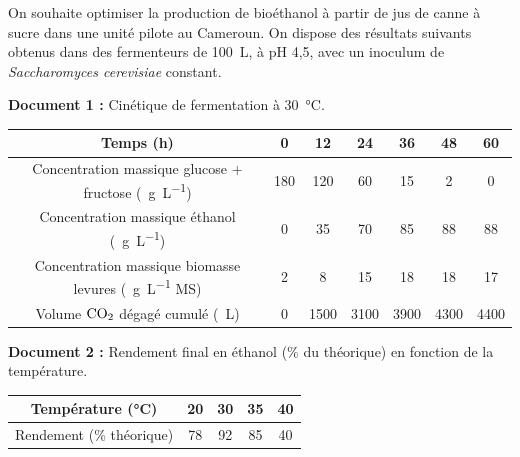 \documentclass[11pt]{article}
\begin{document}
\begin{exercice}
On souhaite optimiser la production de bioéthanol à partir de jus de canne à sucre dans une unité pilote au Cameroun. On dispose des résultats suivants obtenus dans des fermenteurs de \SI{100}{\liter}, à pH 4,5, avec un inoculum de \emph{Saccharomyces cerevisiae} constant.

\textbf{Document 1 :} Cinétique de fermentation à \SI{30}{\celsius}.
\begin{center}
\begin{tabular}{|c|c|c|c|c|c|c|}\hline
Temps (h) & 0 & 12 & 24 & 36 & 48 & 60 \\ \hline
Concentration massique glucose + fructose (\SI{}{\gram\per\liter}) & 180 & 120 & 60 & 15 & 2 & 0 \\ \hline
Concentration massique éthanol (\SI{}{\gram\per\liter}) & 0 & 35 & 70 & 85 & 88 & 88 \\ \hline
Concentration massique biomasse levures (\SI{}{\gram\per\liter} MS) & 2 & 8 & 15 & 18 & 18 & 17 \\ \hline
Volume $\ce{CO2}$ dégagé cumulé (\SI{}{\liter}) & 0 & 1500 & 3100 & 3900 & 4300 & 4400 \\ \hline
\end{tabular}
\end{center}

\textbf{Document 2 :} Rendement final en éthanol (\% du théorique) en fonction de la température.
\begin{center}
\begin{tabular}{|c|c|c|c|c|}\hline
Température (°C) & 20 & 30 & 35 & 40 \\ \hline
Rendement (\% théorique) & 78 & 92 & 85 & 40 \\ \hline
\end{tabular}
\end{center}


\end{exercice}
\end{document}
